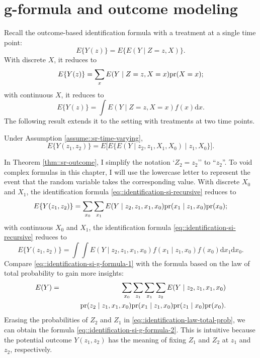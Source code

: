 \section{g-formula and outcome modeling}
\label{section:si-outcome-regression}



Recall the outcome-based identification formula with a treatment at a single time point:
$$
E\{  Y(z) \}  = E\{  E(Y\mid Z=z, X) \} .
$$
With discrete $X$, it reduces to
$$
E\{  Y(z) \}  = \sum_x E(Y\mid Z=z, X=x) \textup{pr}(X=x) ;
$$
with continuous $X$, it reduces to
$$
E\{  Y(z) \}  =  \int E(Y\mid Z=z, X=x) f (x) \text{d} x.
$$
The following result extends it to the setting with treatments at two time points. 
 
 
 
 \begin{theorem}
\label{thm::sr-outcome}
Under Assumption \ref{assume::sr-time-varying}, 
\begin{equation}\label{eq::identification-si-recursive}
E\{ Y(z_1, z_2) \} 
=  E\Big [   E\{    E(Y\mid  z_2, z_1, X_1, X_0)  \mid z_1, X_0 \}  \Big ].
\end{equation}
\end{theorem}


In Theorem \ref{thm::sr-outcome}, I simplify the notation `$Z_2=z_2$'' to ``$z_2$''. To void complex formulas in this chapter, I will use the lowercase letter to represent the event that the random variable takes the corresponding value.  
With discrete $X_0$ and $X_1$, the identification formula \eqref{eq::identification-si-recursive} reduces to
\begin{equation}\label{eq::identification-si-g-formula-1}
E\{ Y(z_1, z_2) \}  = \sum_{x_0} \sum_{x_1} E( Y \mid  z_2, z_1, x_1,  x_0) \pr(x_1\mid    z_1, x_0) \pr(x_0);
\end{equation}
with continuous $X_0$ and $X_1$, the identification formula \eqref{eq::identification-si-recursive} reduces to
\begin{equation}\label{eq::identification-si-g-formula-2}
E\{ Y(z_1, z_2) \}  =  \int \int E( Y \mid  z_2,  z_1, x_1,  x_0) f(x_1\mid    z_1, x_0) f(x_0) \text{d}x_1 \text{d}x_0.
\end{equation}
Compare \eqref{eq::identification-si-g-formula-1} with the formula based on the law of total probability to gain more insights:
\begin{eqnarray}
E(Y)  &=& \sum_{x_0} \sum_{z_1} \sum_{x_1} \sum_{z_2} E( Y \mid  z_2, z_1, x_1,  x_0)  \nonumber   \\
&& \qquad   \pr(z_2 \mid  z_1, x_1,  x_0)
\pr(x_1\mid    z_1, x_0)  \pr(z_1\mid x_0)  \pr(x_0). \label{eq::identification-law-total-prob}
\end{eqnarray}
Erasing the probabilities of $Z_2$ and $Z_1$ in \eqref{eq::identification-law-total-prob}, we can obtain the formula \eqref{eq::identification-si-g-formula-2}. This is intuitive because the potential outcome $Y(z_1, z_2)$ has the meaning of fixing $Z_1$ and $Z_2$ at $z_1$ and $z_2$, respectively. 


